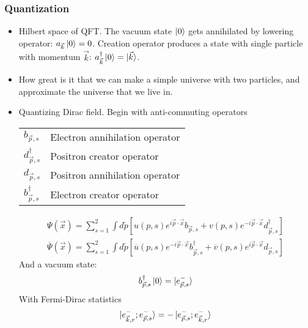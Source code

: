 \subsubsection{Quantization}
\begin{itemize}
    \item Hilbert space of QFT. The vacuum state $\ket{0}$ gets annihilated by lowering operator: $a_{\vec{k}}\ket{0}=0$. Creation operator produces a state with single particle with momentum $\vec{k}$: $a_{\vec{k}}^\dagger\ket{0}=\ket{{\vec{k}}}$. \cite{wells}
    \item How great is it that we can make a simple universe with two particles, and approximate the universe that we live in. \cite{wells}
    \item Quantizing Dirac field. Begin with anti-commuting operators \\ \cite{wells}
        \begin{center} %
        \begin{tabular}{l l}\toprule
        $b_{\vec{p},s}$ & Electron annihilation operator \\
        $d_{\vec{p},s}^\dagger$ & Positron creator operator \\
        $d_{\vec{p},s}$ & Positron annihilation operator \\
        $b_{\vec{p},s}^\dagger$ & Electron creator operator \\
        \bottomrule\end{tabular} %
        \end{center}
        \begin{equation}\begin{split}
            \Psi(\vec{x})=\sum^2_{s=1}\int d\tilde{p}[u(p,s)e^{i\vec{p}\cdot\vec{x}}b_{\vec{p},s} + v(p,s)e^{-i\vec{p}\cdot\vec{x}}d_{\vec{p},s}^\dagger ] \\
            \overline{\Psi}(\vec{x})=\sum^2_{s=1}\int d\tilde{p}[\overline{u}(p,s)e^{-i\vec{p}\cdot\vec{x}}b_{\vec{p},s}^\dagger + \overline{v}(p,s)e^{i\vec{p}\cdot\vec{x}}d_{\vec{p},s} ]
        \end{split}\end{equation}
        And a vacuum state:
        \begin{equation}\begin{split}
        b_{\vec{p},s}^\dagger\ket{0}=\ket{e^-_{\vec{p},s}}
        \end{split}\end{equation}
        With Fermi-Dirac statistics
        \begin{equation}\begin{split}
        \ket{e_{\vec{k},r}^-;e_{\vec{p},s}^-} =
        -\ket{e_{\vec{p},s}^-;e_{\vec{k},r}^-}
        \end{split}\end{equation}
\end{itemize}

